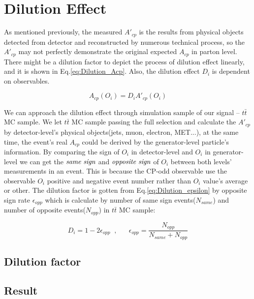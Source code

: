 

\section{Dilution Effect}
\label{sec:Dilution}
	
	As mentioned previously, the measured $A'_{cp}$ is the results from physical objects detected from detector and reconstructed by numerous technical process, so the $A'_{cp}$ may not perfectly demonstrate the original expected $A_{cp}$ in parton level. There might be a dilution factor to depict the process of dilution effect linearly, and it is shown in Eq.\ref{eq:Dilution_Acp}. Also, the dilution effect $D_i$ is dependent on observables.

	\begin{equation}
	A_{cp}(O_i) = D_i A'_{cp}(O_i)
	\label{eq:Dilution_Acp}
	\end{equation}
	\FloatBarrier

	We can approach the dilution effect through simulation sample of our signal -- $t\bar{t}$ MC sample. We let $t\bar{t}$ MC sample passing the full selection and calculate the $A'_{cp}$ by detector-level's physical objects(jets, muon, electron, MET...), at the same time, the event's real $A_{cp}$ could be derived by the generator-level particle's information. By comparing the sign of $O_i$ in detector-level and $O_i$ in generator-level we can get the $\emph{same sign}$ and $\emph{opposite sign}$ of $O_i$ between both levels' measurements in an event. This is because the CP-odd observable use the observable $O_i$ positive and negative event number rather than $O_i$ value's average or other. The dilution factor is gotten from Eq.\ref{eq:Dilution_epsilon} by opposite sign rate $\epsilon_{opp}$ which is calculate by number of same sign events($N_{same}$) and number of opposite events($N_{opp}$) in $t\bar{t}$ MC sample:

	\begin{equation}
	D_i = 1 - 2 \epsilon_{opp} \; \; , \; \; \; \; \; \; \epsilon_{opp} = \frac{N_{opp}}{N_{same} + N_{opp}}
	\label{eq:Dilution_epsilon}
	\end{equation}
	\FloatBarrier

	\subsection{Dilution factor}
	\label{Dilution:dilution_factor}
		

	\subsection{Result}
	\label{Dilution:result}
		


\FloatBarrier
